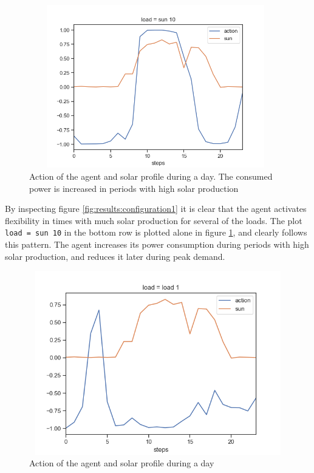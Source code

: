 \documentclass[class=book, crop=false]{standalone}
\begin{document}
\begin{figure}[h]
    \center
\includegraphics[height=7.1cm, width=11cm]{figures/configuration1_follows_sun.png}
    \caption[size = 9]{Action of the agent and solar profile during a day. The consumed power is increased in periods with high solar production}
    \label{fig:results:configuration1_follows_sun}
\end{figure}

By inspecting figure \ref{fig:results:configuration1} it is clear that the agent activates flexibility in times with much solar production for several of the loads. The plot \texttt{load = sun 10} in the bottom row is plotted alone in figure \ref{fig:results:configuration1_follows_sun}, and clearly follows this pattern. The agent increases its power consumption during periods with high solar production, and reduces it later during peak demand.


\begin{figure}[h]
    \center
\includegraphics[height=8cm, width=12cm]{figures/configuration1_negative_actions.png}
    \caption[size = 9]{Action of the agent and solar profile during a day}
    \label{fig:results:configuration1_negative_actions}
\end{figure}
\end{document}
